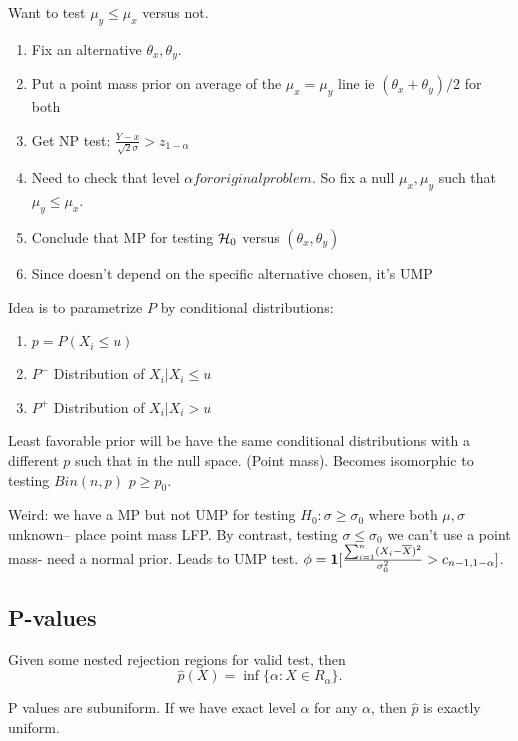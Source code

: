 \documentclass{article}
\begin{document}
\begin{example}
Want to test $\mu_y\leq \mu_x$ versus not. 
\begin{enumerate}
	\item Fix an alternative $\theta_x, \theta_y$. 
	\item Put a point mass prior on average of the $\mu_x = \mu_y$ line ie $(\theta_x + \theta_y)/2$ for both
	\item Get NP test: $\frac{Y-x}{\sqrt{2} \sigma} > z_{1-\alpha}$
	\item Need to check that level $\alpha for original problem$. So fix a null $\mu_x,\mu_y$ such that $\mu_y\leq \mu_x$. 
	\item Conclude that MP for testing $\mathcal H_0$ versus $(\theta_x, \theta_y)$
	\item Since doesn't depend on the specific alternative chosen, it's UMP
\end{enumerate}
\end{example}
\begin{example}
Idea is to parametrize $P$ by conditional distributions:
\begin{enumerate}
	\item $p = P(X_i \leq u)$
	\item $P^-$ Distribution of $X_i| X_i \leq u$
	\item $P^+$ Distribution of $X_i| X_i > u$
\end{enumerate}
Least favorable prior will be have the same conditional distributions with a different $p$ such that in the null space. (Point mass). Becomes isomorphic to testing $Bin(n,p)$ $p \geq p_0$. 
\end{example}

Weird: we have a MP but not UMP for testing $H_0: \sigma \geq \sigma_0$ where both $\mu,\sigma$ unknown-- place point mass LFP. By contrast, testing $\sigma \leq \sigma_0$ we can't use a point mass- need a normal prior. Leads to UMP test. $\phi = \boldsymbol{1}[\frac{\sum_{i=1}^n (X_i - \overline X)^2 }{\sigma_0^2} > c_{n-1, 1-\alpha}]$. 

\subsection{P-values}

\begin{definition}[p-value]
Given some nested rejection regions for valid test, then
$$\hat p(X)= \inf \{\alpha: X\in R_\alpha\}.$$
\end{definition}
\begin{fact}
P values are subuniform. If we have exact level $\alpha$ for any $\alpha$, then $\hat p$ is exactly uniform.
\end{fact}
\newpage
\end{document}
